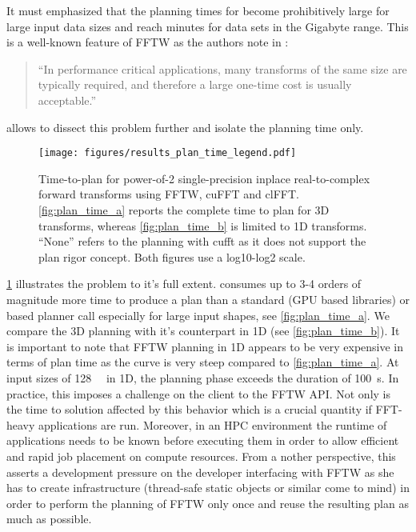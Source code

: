 It must emphasized that the planning times for  become prohibitively large for large input data sizes and reach minutes for data sets in the Gigabyte range. This is a well-known feature of FFTW as the authors note in \cite{FFTW05}:
%
\begin{quote}
  ``In performance critical applications, many transforms of the same
  size are typically required, and therefore a large one-time cost is
  usually acceptable.''
\end{quote}
% 
\gearshifft{} allows to dissect this problem further and isolate the planning time only.
%
\begin{figure}[!tbp]
  \centering
  \texttt{[image: figures/results\_plan\_time\_legend.pdf]}\vspace{-1em}
  \hfill
  \caption{Time-to-plan for power-of-2 single-precision inplace real-to-complex forward transforms using FFTW, cuFFT and clFFT. \cref{fig:plan_time_a} reports the complete time to plan for 3D transforms, whereas \cref{fig:plan_time_b} is limited to 1D transforms. ``None'' refers to the planning with cufft as it does not support the plan rigor concept. Both figures use a log10-log2 scale.}
  \label{fig:plan_time}
\end{figure}
%
\cref{fig:plan_time} illustrates the problem to it's full extent.  consumes up to 3-4 orders of magnitude more time to produce a plan than a standard (GPU based libraries) or  based planner call especially for large input shapes, see \cref{fig:plan_time_a}. We compare the 3D planning with it's counterpart in 1D (see \cref{fig:plan_time_b}). It is important to note that FFTW planning in 1D appears to be very expensive in terms of plan time as the  curve is very steep compared to \cref{fig:plan_time_a}. At input sizes of \SI{128}{\mebi\byte} in 1D, the planning phase exceeds the duration of \SI{100}{\second}. In practice, this imposes a challenge on the client to the FFTW API. Not only is the time to solution affected by this behavior which is a crucial quantity if FFT-heavy applications are run. Moreover, in an HPC environment the runtime of applications needs to be known before executing them in order to allow efficient and rapid job placement on compute resources. From a nother perspective, this asserts a development pressure on the developer interfacing with FFTW as she has to create infrastructure (thread-safe static objects or similar come to mind) in order to perform the planning of FFTW only once and reuse the resulting plan as much as possible.

